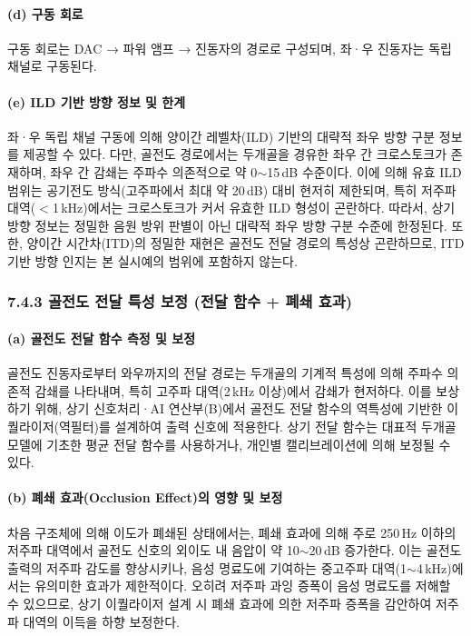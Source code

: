\documentclass{article}
\begin{document}
\paragraph{(d) 구동 회로}

구동 회로는 DAC → 파워 앰프 → 진동자의 경로로 구성되며, 좌·우 진동자는 독립 채널로 구동된다.

\paragraph{(e) ILD 기반 방향 정보 및 한계}

좌·우 독립 채널 구동에 의해 양이간 레벨차(ILD) 기반의 대략적 좌우 방향 구분 정보를 제공할 수 있다. 다만, 골전도 경로에서는 두개골을 경유한 좌우 간 크로스토크가 존재하며, 좌우 간 감쇄는 주파수 의존적으로 약 0$\sim$15\,dB 수준이다. 이에 의해 유효 ILD 범위는 공기전도 방식(고주파에서 최대 약 20\,dB) 대비 현저히 제한되며, 특히 저주파 대역($<$1\,kHz)에서는 크로스토크가 커서 유효한 ILD 형성이 곤란하다. 따라서, 상기 방향 정보는 정밀한 음원 방위 판별이 아닌 대략적 좌우 방향 구분 수준에 한정된다. 또한, 양이간 시간차(ITD)의 정밀한 재현은 골전도 전달 경로의 특성상 곤란하므로, ITD 기반 방향 인지는 본 실시예의 범위에 포함하지 않는다.

\subsubsection{7.4.3 골전도 전달 특성 보정 (전달 함수 + 폐쇄 효과)}

\paragraph{(a) 골전도 전달 함수 측정 및 보정}

골전도 진동자로부터 와우까지의 전달 경로는 두개골의 기계적 특성에 의해 주파수 의존적 감쇄를 나타내며, 특히 고주파 대역(2\,kHz 이상)에서 감쇄가 현저하다. 이를 보상하기 위해, 상기 신호처리·AI 연산부(B)에서 골전도 전달 함수의 역특성에 기반한 이퀄라이저(역필터)를 설계하여 출력 신호에 적용한다. 상기 전달 함수는 대표적 두개골 모델에 기초한 평균 전달 함수를 사용하거나, 개인별 캘리브레이션에 의해 보정될 수 있다.

\paragraph{(b) 폐쇄 효과(Occlusion Effect)의 영향 및 보정}

차음 구조체에 의해 이도가 폐쇄된 상태에서는, 폐쇄 효과에 의해 주로 250\,Hz 이하의 저주파 대역에서 골전도 신호의 외이도 내 음압이 약 10$\sim$20\,dB 증가한다. 이는 골전도 출력의 저주파 감도를 향상시키나, 음성 명료도에 기여하는 중고주파 대역(1$\sim$4\,kHz)에서는 유의미한 효과가 제한적이다. 오히려 저주파 과잉 증폭이 음성 명료도를 저해할 수 있으므로, 상기 이퀄라이저 설계 시 폐쇄 효과에 의한 저주파 증폭을 감안하여 저주파 대역의 이득을 하향 보정한다.
\end{document}
